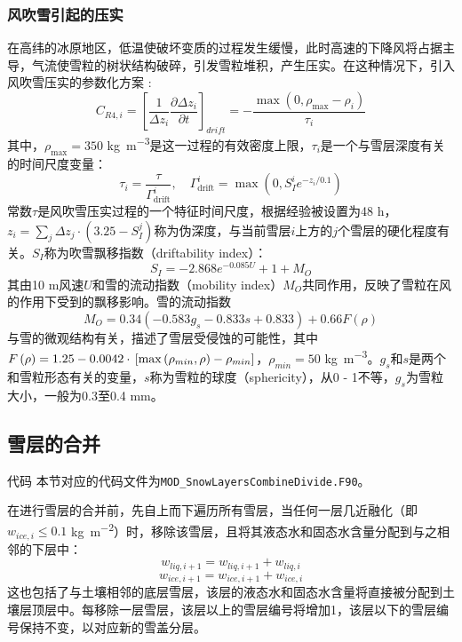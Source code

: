 \subsubsection{风吹雪引起的压实}
在高纬的冰原地区，低温使破坏变质的过程发生缓慢，此时高速的下降风将占据主导，气流使雪粒的树状结构破碎，引发雪粒堆积，产生压实。在这种情况下，引入风吹雪压实的参数化方案 \citep{Vionnet2012}:
\begin{equation}
    C_{R4,i}=\left[\frac{1}{\Delta z_i}\frac{\partial \Delta z_i}{\partial t}\right]_{drift}=-\frac{\max \left(0,\rho_{\text{max}}-\rho_i\right)}{\tau_i}
\end{equation}
其中，$\rho_{\text{max}}=350$ \unit{kg.m^{-3}}是这一过程的有效密度上限，$\tau_i$是一个与雪层深度有关的时间尺度变量：
\begin{equation}
    \tau_i=\frac{\tau}{\Gamma_{\text{drift}}^i}, \quad \Gamma_{\text{drift}}^i=\max \left(0,S_I^i e^{-z_i/0.1}\right)
\end{equation}
常数$\tau$是风吹雪压实过程的一个特征时间尺度，根据经验被设置为48 \unit{h}，$z_i=\sum_j \Delta z_j \cdot \left(3.25-S_I^j\right)$称为伪深度，与当前雪层$i$上方的$j$个雪层的硬化程度有关。$S_I$称为吹雪飘移指数（driftability index）：
\begin{equation}
    S_I=-2.868 e^{-0.085 U} + 1 + M_O
\end{equation}
其由10 \unit{m}风速$U$和雪的流动指数（mobility index）$M_O$共同作用，反映了雪粒在风的作用下受到的飘移影响。雪的流动指数
\begin{equation}
    M_O=0.34\left(-0.583g_s-0.833s+0.833\right)+0.66F\left(\rho\right)
\end{equation}
与雪的微观结构有关，描述了雪层受侵蚀的可能性，其中$F\left(\rho\right)=1.25-0.0042 \cdot \\\left[\max \left(\rho_{min},\rho\right)-\rho_{min}\right]$，$\rho_{min}=50$ \unit{kg.m^{-3}}。$g_s$和$s$是两个和雪粒形态有关的变量，$s$称为雪粒的球度（sphericity），从0 - 1不等，$g_s$为雪粒大小，一般为0.3至0.4 \unit{mm}。


\subsection{雪层的合并}
\begin{mymdframed}{代码}
本节对应的代码文件为\texttt{MOD\_SnowLayersCombineDivide.F90}。
\end{mymdframed}

在进行雪层的合并前，先自上而下遍历所有雪层，当任何一层几近融化（即$w_{ice,i} \leqslant 0.1$ \unit{kg.m^{-2}}）时，移除该雪层，且将其液态水和固态水含量分配到与之相邻的下层中：
\begin{equation}
    w_{liq,i+1} = w_{liq,i+1} + w_{liq,i}
\end{equation}
\begin{equation}
    w_{ice,i+1} = w_{ice,i+1} + w_{ice,i}
\end{equation}
这也包括了与土壤相邻的底层雪层，该层的液态水和固态水含量将直接被分配到土壤层顶层中。每移除一层雪层，该层以上的雪层编号将增加1，该层以下的雪层编号保持不变，以对应新的雪盖分层。

